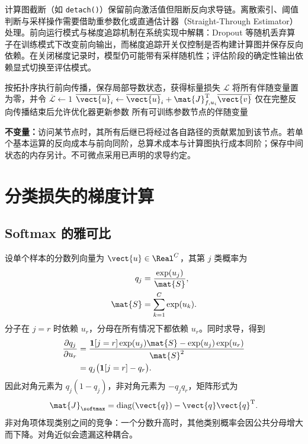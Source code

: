 \documentclass[../textbook.tex]{subfiles}
\begin{document}
计算图截断（如 \texttt{detach()}）保留前向激活值但阻断反向求导链。离散索引、阈值判断与采样操作需要借助重参数化或直通估计器（Straight-Through Estimator）处理。前向运行模式与梯度追踪机制在系统实现中解耦：Dropout 等随机丢弃算子在训练模式下改变前向输出，而梯度追踪开关仅控制是否构建计算图并保存反向依赖。在关闭梯度记录时，模型仍可能带有采样随机性；评估阶段的确定性输出依赖显式切换至评估模式。

\begin{algorithm}[标量损失的反向自动微分]
\label{alg:tensor-reverse}
\begin{myalgorithmic}[1]
\State 按拓扑序执行前向传播，保存局部导数状态，获得标量损失 $\mathcal L$
\State 将所有伴随变量置为零，并令 $\overline{\mathcal L}\gets1$
    \State $\overline{\vect{u}}_i\gets\overline{\vect{u}}_i+\mat{J}_{f,u_i}^{\mathrm{T}}\overline{\vect{v}}$
  \EndFor
\EndFor
\State 仅在完整反向传播结束后允许优化器更新参数
\State \Return 所有可训练参数节点的伴随变量
\end{myalgorithmic}
\textbf{不变量：}访问某节点时，其所有后继已将经过各自路径的贡献累加到该节点。若单个基本运算的反向成本与前向同阶，总算术成本与计算图执行成本同阶；保存中间状态的内存另计。不可微点采用已声明的求导约定。
\end{algorithm}

\section{分类损失的梯度计算}

\subsection{Softmax 的雅可比}
设单个样本的分数列向量为 $\vect{u}\in\Real^C$，其第 $j$ 类概率为
\begin{equation}
\begin{aligned}
 q_j &= \frac{\exp(u_j)}{\mat{S}}, \\
 \mat{S} &= \sum_{k=1}^{C}\exp(u_k).
\end{aligned}
\end{equation}
分子在 $j=r$ 时依赖 $u_r$，分母在所有情况下都依赖 $u_r$。同时求导，得到
\begin{align}
 \frac{\partial q_j}{\partial u_r}
 &=\frac{\mathbf1[j=r]\exp(u_j)\mat{S}-\exp(u_j)\exp(u_r)}{\mat{S}^2}\\
 &=q_j\bigl(\mathbf1[j=r]-q_r\bigr).
\end{align}
因此对角元素为 $q_j(1-q_j)$，非对角元素为 $-q_jq_r$，矩阵形式为
\begin{equation}
 \mat{J}_{\softmax}=\operatorname{diag}(\vect{q})-\vect{q}\vect{q}^{\mathrm{T}}.
 \label{eq:tensor-softmax-jac}
\end{equation}
非对角项体现类别之间的竞争：一个分数升高时，其他类别概率会因公共分母增大而下降。对角近似会遗漏这种耦合。
\end{document}
